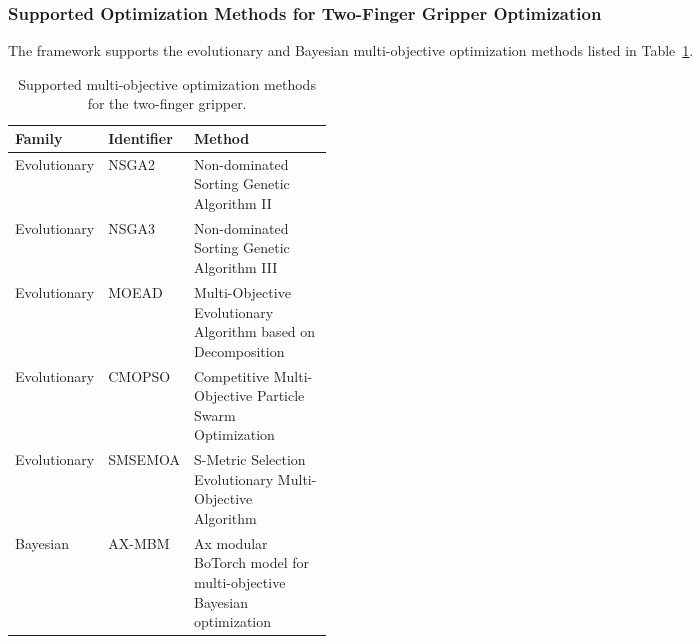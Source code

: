 \subsubsection{Supported Optimization Methods for Two-Finger Gripper Optimization}

The framework supports the evolutionary and Bayesian multi-objective optimization methods listed in
Table~\ref{tab:two_finger_algorithms}.
\begin{table}[H]
\centering
\caption{Supported multi-objective optimization methods for the two-finger gripper.}
\label{tab:two_finger_algorithms}

\small
\begin{tabularx}{\textwidth}{
    @{}
    p{0.20\linewidth}
    p{0.17\linewidth}
    >{\raggedright\arraybackslash}X
    @{}
}
\toprule
\textbf{Family} & \textbf{Identifier} & \textbf{Method} \\
\midrule
Evolutionary
& NSGA2
& Non-dominated Sorting Genetic Algorithm II \\

Evolutionary
& NSGA3
& Non-dominated Sorting Genetic Algorithm III \\

Evolutionary
& MOEAD
& Multi-Objective Evolutionary Algorithm based on Decomposition \\

Evolutionary
& CMOPSO
& Competitive Multi-Objective Particle Swarm Optimization \\

Evolutionary
& SMSEMOA
& S-Metric Selection Evolutionary Multi-Objective Algorithm \\

Bayesian
& AX-MBM
& Ax modular BoTorch model for multi-objective Bayesian optimization%
 \\
\bottomrule
\end{tabularx}
\end{table}


